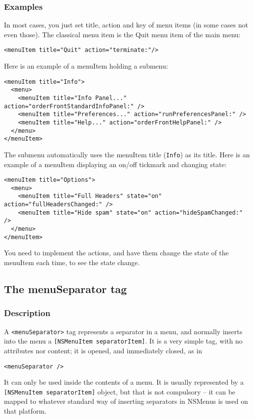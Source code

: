\subsubsection{Examples}
In most cases, you just set title, action and key of menu items (in
some cases not even those).  The classical menu item is the Quit menu
item of the main menu:
\begin{verbatim}
<menuItem title="Quit" action="terminate:"/>
\end{verbatim}
Here is an example of a menuItem holding a submenu:
\begin{verbatim}
<menuItem title="Info">
  <menu>
    <menuItem title="Info Panel..." action="orderFrontStandardInfoPanel:" />
    <menuItem title="Preferences..." action="runPreferencesPanel:" />
    <menuItem title="Help..." action="orderFrontHelpPanel:" />
  </menu>
</menuItem>
\end{verbatim}
The submenu automatically uses the menuItem title (\texttt{Info}) as
its title.  Here is an example of a menuItem displaying an on/off tickmark
and changing state:
\begin{verbatim}
<menuItem title="Options">
  <menu>
    <menuItem title="Full Headers" state="on" action="fullHeadersChanged:" />
    <menuItem title="Hide spam" state="on" action="hideSpamChanged:" />
  </menu>
</menuItem>
\end{verbatim}
You need to implement the actions, and have them change the state of the
menuItem each time, to see the state change.

\subsection{The menuSeparator tag}

\subsubsection{Description}
A \texttt{<menuSeparator>} tag represents a separator in a menu, and
normally inserts into the menu a \texttt{[NSMenuItem separatorItem]}.
It is a very simple tag, with no attributes nor content; it is opened,
and immediately closed, as in
\begin{verbatim}
<menuSeparator />
\end{verbatim}
It can only be used inside the contents of a menu.  It is usually
represented by a \texttt{[NSMenuItem separatorItem]} object, but that
is not compulsory -- it can be mapped to whatever standard way of
inserting separators in NSMenus is used on that platform.

